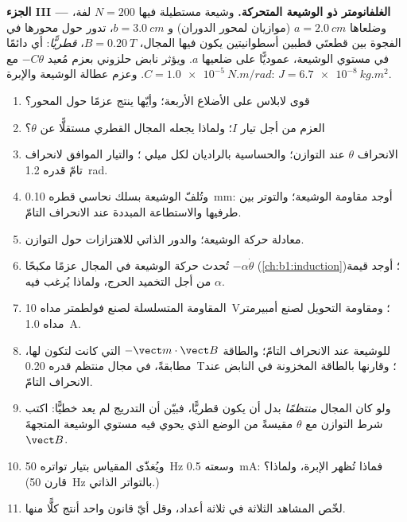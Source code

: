 \begin{problem}
\medskip
\noindent\textbf{الجزء III --- الغلفانومتر ذو الوشيعة المتحركة.}
وشيعة مستطيلة فيها $N = 200$ لفة، وضلعاها $a = \qty{2.0}{cm}$ (موازيان
لمحور الدوران) و $b = \qty{3.0}{cm}$، تدور حول محورها في
الفجوة بين قطعتَي قطبين أسطوانيتين يكون فيها المجال، $B = \qty{0.20}{T}$،
\emph{قطريًّا}: أي دائمًا في مستوي الوشيعة، عموديًّا على
ضلعيها $a$. ويؤثر نابض حلزوني بعزم مُعيد $-C\theta$ مع
$C = \qty{1.0e-5}{N.m/rad}$. وعزم عطالة الوشيعة والإبرة:
$J = \qty{6.7e-8}{kg.m^2}$.
\begin{enumerate}[resume]
  \item قوى لابلاس على الأضلاع الأربعة؛ وأيّها ينتج عزمًا
        حول المحور؟
  \item العزم من أجل تيار $I$؛ ولماذا يجعله المجال القطري
        مستقلًّا عن $\theta$؟
  \item الانحراف $\theta$ عند التوازن؛ والحساسية بالراديان لكل
        ميلي ؛ والتيار الموافق لانحراف تامّ قدره \qty{1.2}{rad}.
  \item وتُلفّ الوشيعة بسلك نحاسي قطره \qty{0.10}{mm}:
        أوجد مقاومة الوشيعة؛ والتوتر بين طرفيها والاستطاعة المبددة عند
        الانحراف التامّ.
  \item معادلة حركة الوشيعة؛ والدور الذاتي
        للاهتزازات حول التوازن.
  \item تُحدث حركة الوشيعة في المجال عزمًا مكبحًا
        $-\alpha\dot\theta$ (\cref{ch:b1:induction})؛ أوجد قيمة $\alpha$ من أجل
        التخميد الحرج، ولماذا يُرغب فيه.
  \item المقاومة المتسلسلة لصنع فولطمتر مداه \qty{10}{V}؛ ومقاومة
        التحويل لصنع أمبيرمتر مداه \qty{1.0}{A}.
  \item {} للوشيعة عند الانحراف التامّ؛ والطاقة $-\vect m\cdot
        \vect B$ التي كانت لتكون لها، مطابقةً، في مجال منتظم قدره \qty{0.20}{T}؛
        وقارنها بالطاقة المخزونة في النابض عند الانحراف التامّ.
  \item ولو كان المجال \emph{منتظمًا} بدل أن يكون قطريًّا، فبيّن أن
        التدريج لم يعد خطيًّا: اكتب شرط التوازن
        مع $\theta$ مقيسةً من الوضع الذي يحوي فيه مستوي الوشيعة
        المتجهةَ $\vect B$.
  \item ويُغذّى المقياس بتيار تواتره \qty{50}{Hz} وسعته \qty{0.5}{mA}:
        فماذا تُظهر الإبرة، ولماذا؟ (قارن \qty{50}{Hz}
        بالتواتر الذاتي.)
  \item لخّص المشاهد الثلاثة في ثلاثة أعداد، وقل أيّ قانون واحد
        أنتج كلًّا منها.
\end{enumerate}
\end{problem}
